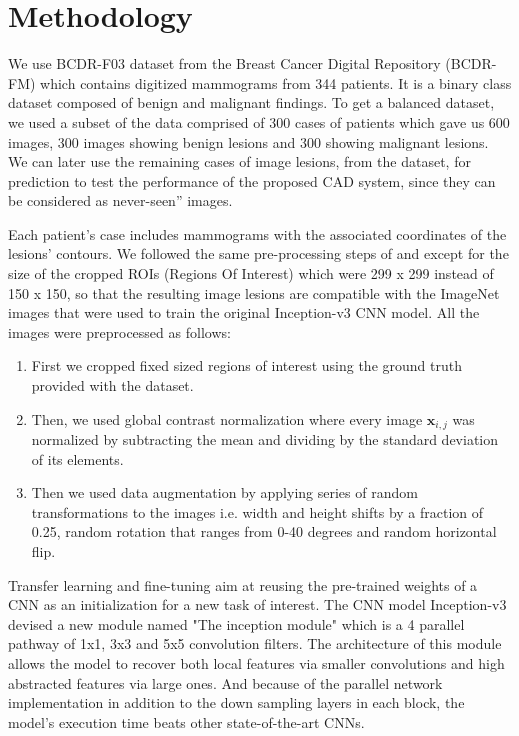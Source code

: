\documentclass{article}
\begin{document}
\section{Methodology}

We use BCDR-F03 dataset \citep{lopez2012bcdr}from the Breast Cancer Digital Repository (BCDR-FM) which contains digitized mammograms from 344 patients. It is a binary class dataset composed of benign and malignant findings. To get a balanced dataset, we used a subset of the data comprised of 300 cases of patients which gave us 600 images, 300 images showing benign lesions and 300 showing malignant lesions. We can later use the remaining cases of image lesions, from the dataset, for prediction to test the performance of the proposed CAD system, since they can be considered as never-seen” images.

Each patient’s case includes mammograms with the associated coordinates of the lesions’ contours.
We followed the same pre-processing steps of \citep{arevalo2016representation} and \citep{perre2017lesion} except for the size of the cropped ROIs (Regions Of  Interest) which were 299 x 299 instead of 150 x 150,  so that the resulting image lesions are compatible with the ImageNet images that were used to train the original Inception-v3 CNN model.
All the images were preprocessed as follows:
\begin{enumerate}
\item First we cropped fixed sized regions of interest using the ground truth provided with the dataset.\label{item:1}
\item Then, we used global contrast normalization where every image $\mathbf{x}_{i,j}$ was normalized by subtracting the mean and dividing by the standard deviation of its elements.\label{item:2}
\item Then we used data augmentation by applying series of random transformations to the images i.e. width and height shifts by a fraction of 0.25, random rotation that ranges from 0-40 degrees and random horizontal flip. \label{item:3}
\end{enumerate}

Transfer learning and fine-tuning aim at reusing the pre-trained weights of a CNN as an initialization for a new task of interest. The CNN model Inception-v3 \citep{szegedy2016rethinking} devised a new module named "The inception module" which is a 4 parallel pathway of 1x1, 3x3 and 5x5 convolution filters. The architecture of this module allows the model to recover both local features via smaller convolutions and high abstracted features via large ones. And because of the parallel network implementation in addition to the down sampling layers in each block, the model's execution time beats other state-of-the-art CNNs.
\end{document}
